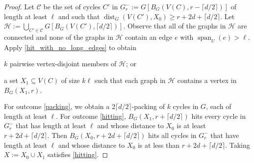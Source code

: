\documentclass{patmorin}
\DeclareMathOperator{\spn}{span}
\DeclareMathOperator{\dist}{dist}
\begin{document}
\begin{proof}
  Let $\mathcal{C}$ be the set of cycles $C'$ in $G^-_{r}:=G[B_G(V(C),r-\lceil d/2\rceil)]$ of length at least $\ell$ and such that $\dist_G(V(C'),X_0)\ge r+2d+\lceil d/2\rceil$.  Let $\mathcal{H}:=\bigcup_{C'\in\mathcal{C}} G[B_G(V(C'),\lceil d/2\rceil)]$.  Observe that all of the graphs in $\mathcal{H}$ are connected and none of the graphs in $\mathcal{H}$ contain an edge $e$ with $\spn_{U}(e)>\ell$.  Apply \cref{hit_with_no_long_edges} to obtain
  \begin{enumerate*}[nosep,nolistsep,label=(\alph*)]
    \item $k$ pairwise vertex-disjoint members of $\mathcal{H}$; or
    \item a set $X_1\subseteq V(C)$ of size $k\ell$ such that each graph in $\mathcal{H}$ contains a vertex in $B_G(X_1,r)$.
  \end{enumerate*}
  For outcome \ref{packing}, we obtain a $2\lceil d/2\rceil$-packing of $k$ cycles in $G$, each of length at least $\ell$. For outcome \ref{hitting}, $B_G(X_1,r+\lceil d/2\rceil)$ hits every cycle in $G^-_r$ that has length at least $\ell$ and whose distance to $X_0$ is at least $r+2d+\lceil d/2\rceil$. Then $B_G(X_0,r+2d+\lceil d/2\rceil)$ hits all cycles in $G^-_r$ that have length at least $\ell$ and whose distance to $X_0$ is at less than $r+2d+\lceil d/2\rceil$. Taking $X:=X_0\cup X_1$ satisfies \ref{hitting}.
\end{proof}
\end{document}
